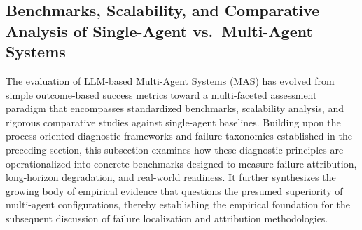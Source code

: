 \documentclass[11pt]{article}
\begin{document}
\subsection{Benchmarks, Scalability, and Comparative Analysis of Single-Agent vs.~Multi-Agent Systems}

The evaluation of LLM-based Multi-Agent Systems (MAS) has evolved from simple outcome-based success metrics toward a multi-faceted assessment paradigm that encompasses standardized benchmarks, scalability analysis, and rigorous comparative studies against single-agent baselines. Building upon the process-oriented diagnostic frameworks and failure taxonomies established in the preceding section, this subsection examines how these diagnostic principles are operationalized into concrete benchmarks designed to measure failure attribution, long-horizon degradation, and real-world readiness. It further synthesizes the growing body of empirical evidence that questions the presumed superiority of multi-agent configurations, thereby establishing the empirical foundation for the subsequent discussion of failure localization and attribution methodologies.
\end{document}
